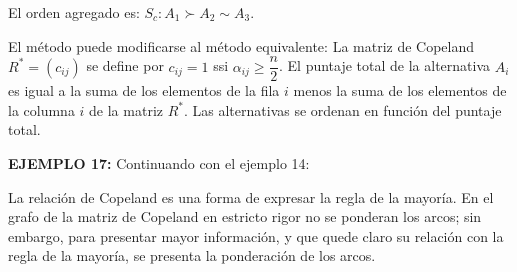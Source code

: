 \documentclass[a5paper,doc,10pt,noapacite]{apa6}
\begin{document}
{{El orden agregado es: \(S_c: A_1 \succ A_2 \sim A_3\).

El método puede modificarse al método equivalente: La matriz de Copeland \(R^* = (c_{ij})\) se define por \(c_{ij} = 1\) ssi \(\alpha_{ij} \geq \dfrac{n}{2}\). El puntaje total de la alternativa \(A_i\) es igual a la suma de los elementos de la fila \(i\) menos la suma de los elementos de la columna \(i\) de la matriz \(R^*\). Las alternativas se ordenan en función del puntaje total.

\vspace{1\baselineskip} 
\textbf{EJEMPLO 17:} Continuando con el ejemplo 14:

\vspace{-1\baselineskip}
\begin{figure}[H]
\begin{floatrow}
	\fontsize{7}{11}\selectfont
	\captionsetup{justification=centering, labelfont=footnotesize, font=footnotesize}
\end{floatrow}
\end{figure}
%


La relación de Copeland es una forma de expresar la regla de la mayoría. En el grafo de la matriz de Copeland en estricto rigor no se ponderan los arcos; sin embargo, para presentar mayor información, y que quede claro su relación con la regla de la mayoría, se presenta la ponderación de los arcos.

}}
\end{document}
